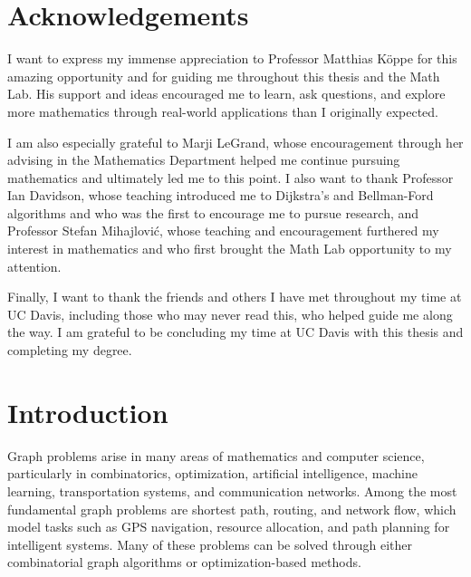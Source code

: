 \documentclass[12pt]{report}
\begin{document}
\tableofcontents
\newpage


\chapter*{Acknowledgements}

I want to express my immense appreciation to Professor Matthias K\"oppe for this amazing opportunity and for guiding me throughout this thesis and the Math Lab. His support and ideas encouraged me to learn, ask questions, and explore more mathematics through real-world applications than I originally expected. 

I am also especially grateful to Marji LeGrand, whose encouragement through her advising in the Mathematics Department helped me continue pursuing mathematics and ultimately led me to this point. I also want to thank Professor Ian Davidson, whose teaching introduced me to Dijkstra's and Bellman-Ford algorithms and who was the first to encourage me to pursue research, and Professor Stefan Mihajlovi\'c, whose teaching and encouragement furthered my interest in mathematics and who first brought the Math Lab opportunity to my attention.

Finally, I want to thank the friends and others I have met throughout my time at UC Davis, including those who may never read this, who helped guide me along the way. I am grateful to be concluding my time at UC Davis with this thesis and completing my degree.

\newpage


\chapter*{Introduction}

Graph problems arise in many areas of mathematics and computer science, particularly in combinatorics, optimization, artificial intelligence, machine learning, transportation systems, and communication networks. Among the most fundamental graph problems are shortest path, routing, and network flow, which model tasks such as GPS navigation, resource allocation, and path planning for intelligent systems. Many of these problems can be solved through either combinatorial graph algorithms or optimization-based methods.
\end{document}
